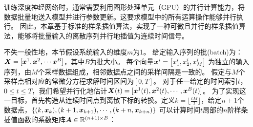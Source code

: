 训练深度神经网络时，通常需要利用图形处理单元（GPU）的并行计算能力，将数据批量地送入模型并进行参数更新。这要求模型中的所有运算操作能够并行执行。
因此，本章基于标准的样条插值算法，实现了一种可微且并行的样条插值算法，能够将批量输入的离散序列并行地插值为连续时间信号。

不失一般性地，本节假设系统输入的维度$m$为1。
给定输入序列的批(batch)为：
$\boldsymbol X = [\boldsymbol x ^1, \boldsymbol x ^2,\cdots\boldsymbol x^B]$，其中$B$为批大小。
每个向量$\boldsymbol x^i=\left[x_1^i, x_2^i, x_M ^i\right]$
为独立的输入序列，由$M$个采样数据组成，相邻数据点之间的采样间隔是一致的。
假定与$M$个采样点相对应的常微分方程求解时间区间为$[0,T]$。
对于任一给定的时间索引$t$，$0\leq t \leq T$，我们希望并行化地估计$\boldsymbol X(t) = [\boldsymbol x ^1(t),\boldsymbol x ^2(t),\cdots,\boldsymbol x^B(t)]$。
为了实现这一目标，首先构造从连续时间点到离散下标的转换。定义$k=\lfloor \frac{tM}{T} \rfloor$，给定$n+1$个数据点，$\{(k, \boldsymbol x_k),(k+1, \boldsymbol x_{k+1}),\cdots,(k+n, \boldsymbol x_{k+n})\}$
可以计算时间$t$局部的$n$阶样条插值函数的系数矩阵$\boldsymbol A\in\mathbb{R}^{(n+1)\times B}$：

